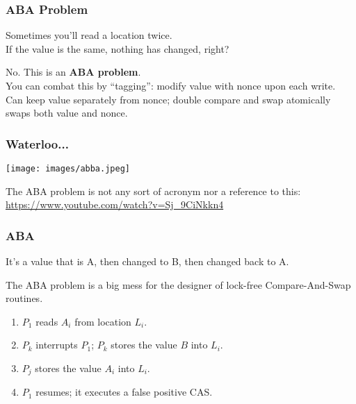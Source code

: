 \begin{frame}[fragile]
  \frametitle{ABA Problem}

  
    Sometimes you'll read a location twice.\\[1em]

    If the value is the same, nothing has changed, right?

    \pause

    \alert{No.} This is an {\bf ABA problem}.\\[1em]

    You can combat this by ``tagging'': modify value with nonce upon each write.\\[1em]

    Can keep value separately from nonce; double compare and swap atomically swaps both value and nonce.\\[2em]


  
\end{frame}


\begin{frame}
\frametitle{Waterloo...}

\begin{center}
	\texttt{[image: images/abba.jpeg]}
\end{center}

The ABA problem is not any sort of acronym nor a reference to this: \url{https://www.youtube.com/watch?v=Sj_9CiNkkn4}


\end{frame}



\begin{frame}
\frametitle{ABA}

It's a value that is A, then changed to B, then changed back to A. 

The ABA problem is a big mess for the designer of lock-free Compare-And-Swap routines. 

\begin{enumerate}
	\item $P_{1}$ reads $A_{i}$ from location $L_{i}$.
	\item $P_{k}$ interrupts $P_{1}$; $P_{k}$ stores the value $B$ into $L_{i}$.
	\item $P_{j}$ stores the value $A_{i}$ into $L_{i}$.
	\item $P_{1}$ resumes; it executes a false positive CAS.
\end{enumerate} 


\end{frame}




